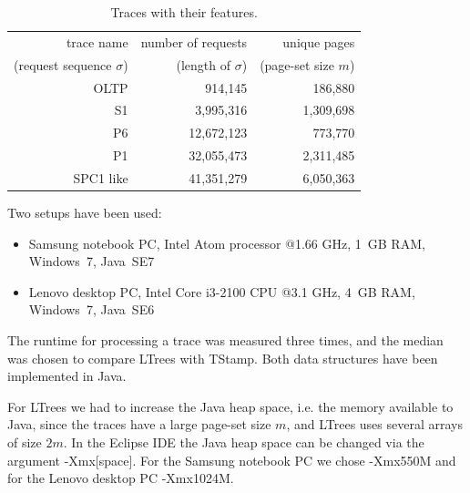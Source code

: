 \documentclass[a4paper,12pt, titlepage]{article}  %
\begin{document}
\begin{table}[hb]
\begin{center}
	\begin{tabular}{|r||r|r|}
	  	\hline
                trace name                              &     number of requests        &      unique pages \\
               (request sequence $\sigma$)     &     (length of $\sigma$)       &      (page-set size $m$) \\
		\hline
               OLTP                                       &          914,145                  &      186,880      \\
               \hline		
		S1                                          &       3,995,316                   &     1,309,698   \\
		\hline
                P6                                          &      12,672,123                   &      773,770     \\
                \hline
                P1                                          &      32,055,473                   &    2,311,485    \\
                \hline
               SPC1 like                                 &      41,351,279                  &      6,050,363   \\
                \hline
	\end{tabular}
	\caption{Traces with their features.}
        \label{tab:traces}
\end{center}
\end{table}

\noindent Two setups have been used:
\begin{itemize}
	\item Samsung notebook PC, Intel Atom processor @1.66 GHz, 1~GB RAM, Windows~7, Java~SE7
        \item Lenovo desktop PC, Intel Core i3-2100 CPU @3.1 GHz, 4~GB RAM, Windows~7, Java~SE6
\end{itemize}

The runtime for processing a trace was measured three times, and the median was chosen to compare 
LTrees with TStamp. Both data structures have been implemented in Java. 

For LTrees we had to increase the Java heap space, i.e. the memory available to Java, since
the traces have a large page-set size $m$, and LTrees uses several arrays of size $2m$.
In the Eclipse IDE the Java heap space can be changed via the argument -Xmx[space]. For the Samsung 
notebook PC we chose -Xmx550M and for the Lenovo desktop PC -Xmx1024M. 
\end{document}
